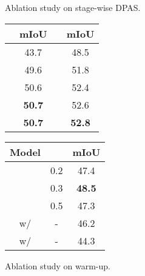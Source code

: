 \documentclass[10pt,twocolumn,letterpaper]{article}
\begin{document}
\begin{figure}[t!]
  \begin{minipage}[c]{0.45\linewidth}
    \small
    \centering
    \makeatletter{}\makeatother\caption{Ablation study on stage-wise DPAS.}
    \label{tab:Ablation_performance}
    \setlength{\tabcolsep}{4pt}
      \begin{tabular}{cccc}
        \toprule[1.0pt]
         &mIoU&  &mIoU\\
        \hline
         & 43.7 &  &48.5\\
               
         & 49.6 &  &51.8\\
        
         & 50.6 & &52.4\\
        
          & \textbf{50.7} &  &52.6\\
         & \textbf{50.7} &  &\textbf{52.8}\\
        \bottomrule
        \end{tabular}
   \end{minipage}
   \hspace{.15in}
 \begin{minipage}[c]{0.45\linewidth}
\small
\centering
     \makeatletter{}\makeatother\caption{Ablation study on  warm-up.}
         \setlength{\tabcolsep}{4pt}
        \label{tab:Ablation_init}
        \begin{tabular}{ccc}
        
        \toprule[1.0pt]
        Model &  &mIoU\\
        \hline
         &0.2 &47.4\\
         &0.3 &\textbf{48.5}\\
        &0.5 & 47.3\\
        \hline
         w/ & - &46.2\\
         w/  & - &44.3\\
        \bottomrule
        
        \end{tabular}
  \end{minipage}
\vspace{-0.7cm}
\end{figure}
\end{document}
